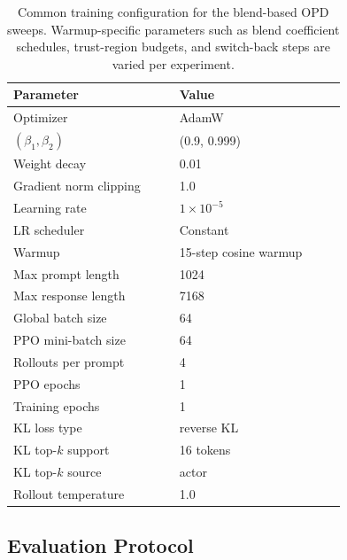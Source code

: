 \documentclass{llmxive}
\begin{document}
\begin{table}[!htbp]
\centering
\small
\setlength{\tabcolsep}{5pt}
\begin{tabular}{p{0.42\linewidth}p{0.42\linewidth}}
\toprule
Parameter & Value \\
\midrule
Optimizer & AdamW \citep{adamw} \\
$(\beta_1, \beta_2)$ & (0.9, 0.999) \\
Weight decay & 0.01 \\
Gradient norm clipping & 1.0 \\
Learning rate & $1 \times 10^{-5}$ \\
LR scheduler & Constant \\
Warmup & 15-step cosine warmup \\
Max prompt length & 1024 \\
Max response length & 7168 \\
Global batch size & 64 \\
PPO mini-batch size & 64 \\
Rollouts per prompt & 4 \\
PPO epochs & 1 \\
Training epochs & 1 \\
KL loss type & reverse KL  \\
KL top-$k$ support & 16 tokens \\
KL top-$k$ source & actor \\
Rollout temperature & 1.0 \\
\bottomrule
\end{tabular}
\caption{Common training configuration for the blend-based OPD sweeps. Warmup-specific parameters such as blend coefficient schedules, trust-region budgets, and switch-back steps are varied per experiment.}
\label{tab:training-hparams}
\end{table}

\subsection{Evaluation Protocol}
\end{document}

